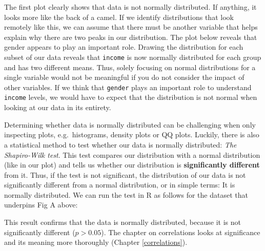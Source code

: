 \documentclass[
]{book}
\newenvironment{Shaded}{\begin{snugshade}}{\end{snugshade}}
\newcommand{\DocumentationTok}[1]{\textcolor[rgb]{0.56,0.35,0.01}{\textbf{\textit{#1}}}}
\newcommand{\FunctionTok}[1]{\textcolor[rgb]{0.00,0.00,0.00}{#1}}
\newcommand{\NormalTok}[1]{#1}
\newcommand{\SpecialCharTok}[1]{\textcolor[rgb]{0.00,0.00,0.00}{#1}}
\begin{document}
The first plot clearly shows that data is not normally distributed. If anything, it looks more like the back of a camel. If we identify distributions that look remotely like this, we can assume that there must be another variable that helps explain why there are two peaks in our distribution. The plot below reveals that gender appears to play an important role. Drawing the distribution for each subset of our data reveals that \texttt{income} is now normally distributed for each group and has two different means. Thus, solely focusing on normal distributions for a single variable would not be meaningful if you do not consider the impact of other variables. If we think that \texttt{gender} plays an important role to understand \texttt{income} levels, we would have to expect that the distribution is not normal when looking at our data in its entirety.

Determining whether data is normally distributed can be challenging when only inspecting plots, e.g.~histograms, density plots or QQ plots. Luckily, there is also a statistical method to test whether our data is normally distributed: \emph{The Shapiro-Wilk test}. This test compares our distribution with a normal distribution (like in our plot) and tells us whether our distribution is \textbf{significantly different} from it. Thus, if the test is not significant, the distribution of our data is not significantly different from a normal distribution, or in simple terms: It is normally distributed. We can run the test in R as follows for the dataset that underpins Fig A above:

\begin{Shaded}
\end{Shaded}

This result confirms that the data is normally distributed, because it is not significantly different (\(p > 0.05\)). The chapter on correlations looks at significance and its meaning more thoroughly (Chapter \ref{correlations}).
\end{document}
